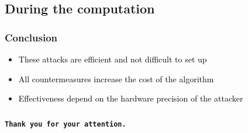 \documentclass{beamer}
\begin{document}
    \begin{frame}
        \frametitle{}
    \end{frame}
    
    \begin{frame}
        \frametitle{}
    \end{frame}
    
    \begin{frame}
        \frametitle{}
    \end{frame}
    
    \begin{frame}
        \frametitle{}
    \end{frame}
    
    \begin{frame}
        \frametitle{}
    \end{frame}

    \subsection{During the computation}

\begin{frame}
    \frametitle{Conclusion}

    \begin{itemize}
        \item \textcolor{black}{These attacks are efficient and not difficult to set up}
        \item \textcolor{black}{All countermeasures increase the cost of the algorithm}
	\item \textcolor{black}{Effectiveness depend on the hardware precision of the attacker}
    \end{itemize}

\end{frame}


\begin{frame}
    \frametitle{}
    \begin{center}
        {\Huge\bf\tt Thank you for your attention.}
    \end{center}
\end{frame}
\end{document}
